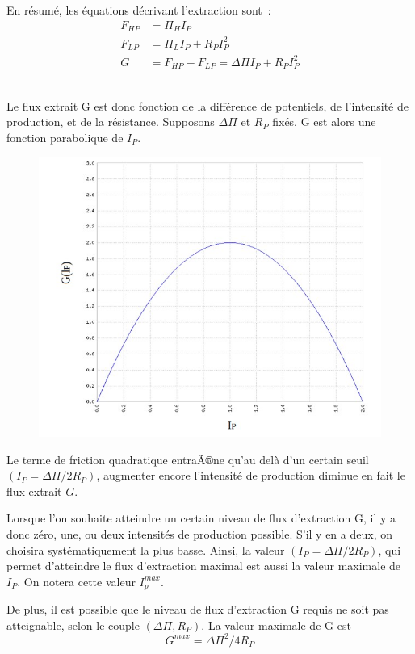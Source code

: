 \documentclass[12pt,a4paper]{article}%
\begin{document}
En résumé, les équations décrivant l'extraction sont~:%
\begin{align*}
F_{HP}  &  =\Pi_{H}I_{P}\\
F_{LP}  &  =\Pi_{L}I_{P}+R_{P}I_{P}^{2}\\
G  &  =F_{HP}-F_{LP}=\Delta\Pi I_{P}+R_{P}I_{P}^{2}%
\end{align*}
\ \ \ \ \ \ \ \ 

Le flux extrait G est donc fonction de la différence de potentiels, de
l'intensité de production, et de la résistance. Supposons $\Delta\Pi$ et
$R_{P}$ fixés. G est alors une fonction parabolique de $I_{P}$.

\begin{figure}[h]
\centering
\includegraphics[width=1.0\textwidth]{figures/Prod-I.jpg}\end{figure}

Le terme de friction quadratique entraÃ®ne qu'au delà d'un certain seuil
$(I_{P}=\Delta\Pi/2R_{P})$, augmenter encore l'intensité de production diminue
en fait le flux extrait $G$.

Lorsque l'on souhaite atteindre un certain niveau de flux d'extraction G, il y
a donc zéro, une, ou deux intensités de production possible. S'il y en a deux,
on choisira systématiquement la plus basse. Ainsi, la valeur $(I_{P}=\Delta
\Pi/2R_{P})$, qui permet d'atteindre le flux d'extraction maximal est aussi la
valeur maximale de $I_{P}$. On notera cette valeur $I_{p}^{max}$.

De plus, il est possible que le niveau de flux d'extraction G requis ne soit
pas atteignable, selon le couple $(\Delta\Pi,R_{P})$. La valeur maximale de G
est
\[
G^{max}=\Delta\Pi^{2}/4R_{P}%
\]
\end{document}
